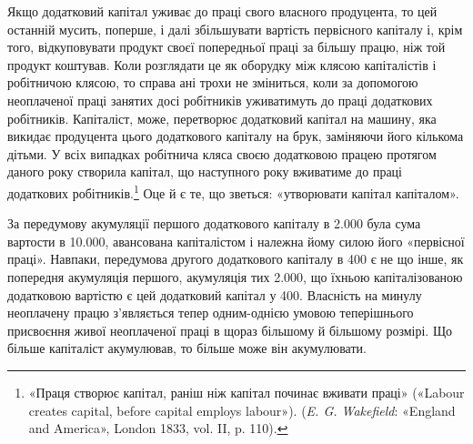 Якщо додатковий капітал уживає до праці свого власного
продуцента, то цей останній мусить, поперше, і далі збільшувати
вартість первісного капіталу і, крім того, відкуповувати продукт
своєї попередньої праці за більшу працю, ніж той продукт коштував.
Коли розглядати це як оборудку між клясою капіталістів
і робітничою клясою, то справа ані трохи не зміниться,
коли за допомогою неоплаченої праці занятих досі робітників
уживатимуть до праці додаткових робітників. Капіталіст, може,
перетворює додатковий капітал на машину, яка викидає продуцента
цього додаткового капіталу на брук, заміняючи його
кількома дітьми. У всіх випадках робітнича кляса своєю додатковою
працею протягом даного року створила капітал, що наступного
року вживатиме до праці додаткових робітників.\footnote{
«Праця створює капітал, раніш ніж капітал починає вживати
праці» («Labour creates capital, before capital employs labour»). (\emph{E. G.
Wakefield}: «England and America», London 1833, vol. II, p. 110).
} Оце й є те, що зветься: «утворювати капітал капіталом».

За передумову акумуляції першого додаткового капіталу в
\num{2.000} була сума вартости в \num{10.000},
авансована капіталістом і належна йому силою його
«первісної праці». Навпаки, передумова другого додаткового
капіталу в 400 є не що інше, як попередня акумуляція
першого, акумуляція тих \num{2.000}, що
їхньою капіталізованою додатковою вартістю є цей додатковий
капітал у 400. Власність на минулу неоплачену
працю з’являється тепер одним-однією умовою теперішнього
присвоєння живої неоплаченої праці в щораз більшому й
більшому розмірі. Що більше капіталіст акумулював, то більше
може він акумулювати.

